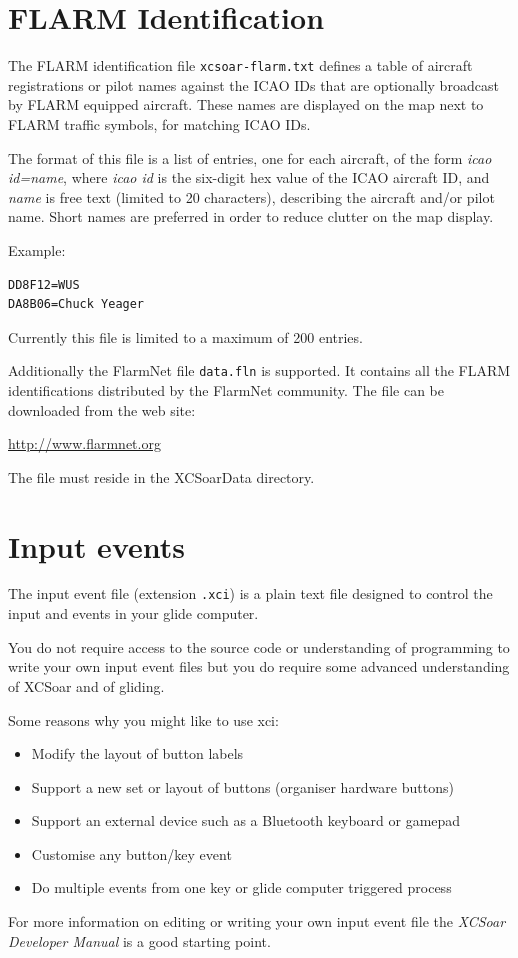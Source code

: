 \section{FLARM Identification}\label{sec:flarm-ident-file}

The FLARM identification file \verb|xcsoar-flarm.txt| defines a table
of aircraft registrations or pilot names against the ICAO IDs that are
optionally broadcast by FLARM equipped aircraft.  These names are
displayed on the map next to FLARM traffic symbols, for matching ICAO
IDs.

The format of this file is a list of entries, one for each aircraft,
of the form {\em icao id=name}, where {\em icao id} is the six-digit
hex value of the ICAO aircraft ID, and {\em name} is free text
(limited to 20 characters), describing the aircraft and/or pilot name.
Short names are preferred in order to reduce clutter on the map
display.

Example:
\begin{verbatim}
DD8F12=WUS
DA8B06=Chuck Yeager
\end{verbatim}

Currently this file is limited to a maximum of 200 entries.

Additionally the FlarmNet file \verb|data.fln| is supported. It contains all 
the FLARM identifications distributed by the FlarmNet community. The file can 
be downloaded from the web site:

\url{http://www.flarmnet.org}

The file must reside in the XCSoarData directory.


\section{Input events}

The input event file (extension \verb|.xci|) is a plain text file
designed to control the input and events in your glide computer.

You do not require access to the source code or understanding of
programming to write your own input event files but you do require
some advanced understanding of XCSoar and of gliding.

Some reasons why you might like to use xci:
\begin{itemize}
\item Modify the layout of button labels
\item Support a new set or layout of buttons (organiser hardware buttons)
\item Support an external device such as a Bluetooth keyboard or gamepad
\item Customise any button/key event
\item Do multiple events from one key or glide computer triggered process
\end{itemize}
For more information on editing or writing your own input event
file the {\em XCSoar Developer Manual} is a good starting point.


